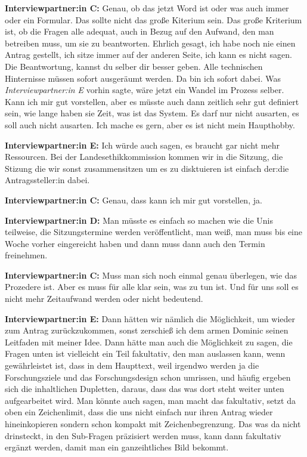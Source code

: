 \documentclass[a4paper,12pt,twoside]{scrreprt}
\begin{document}
\textbf{Interviewpartner:in C:} Genau, ob das jetzt Word ist oder was auch immer oder ein Formular. Das sollte nicht das große Kiterium sein. Das große Kriterium ist, ob die Fragen alle adequat, auch in Bezug auf den Aufwand, den man betreiben muss, um sie zu beantworten. Ehrlich gesagt, ich habe noch nie einen Antrag gestellt, ich sitze immer auf der anderen Seite, ich kann es nicht sagen. Die Beantwortung, kannst du selber dir besser geben. Alle technischen Hinternisse müssen sofort ausgeräumt werden. Da bin ich sofort dabei. Was \textit{Interviewpartner:in E} vorhin sagte, wäre jetzt ein Wandel im Prozess selber. Kann ich mir gut vorstellen, aber es müsste auch dann zeitlich sehr gut definiert sein, wie lange haben sie Zeit, was ist das System. Es darf nur nicht ausarten, es soll auch nicht ausarten. Ich mache es gern, aber es ist nicht mein Haupthobby.

\textbf{Interviewpartner:in E:} Ich würde auch sagen, es braucht gar nicht mehr Ressourcen. Bei der Landesethikkommission kommen wir in die Sitzung, die Stizung die wir sonst zusammensitzen um es zu disktuieren ist einfach der:die Antragssteller:in dabei.

\textbf{Interviewpartner:in C:} Genau, dass kann ich mir gut vorstellen, ja.

\textbf{Interviewpartner:in D:} Man müsste es einfach so machen wie die Unis teilweise, die Sitzungstermine werden veröffentlicht, man weiß, man muss bis eine Woche vorher eingereicht haben und dann muss dann auch den Termin freinehmen.

\textbf{Interviewpartner:in C:} Muss man sich noch einmal genau überlegen, wie das Prozedere ist. Aber es muss für alle klar sein, was zu tun ist. Und für uns soll es nicht mehr Zeitaufwand werden oder nicht bedeutend.

\textbf{Interviewpartner:in E:} Dann hätten wir nämlich die Möglichkeit, um wieder zum Antrag zurückzukommen, sonst zerschieß ich dem armen Dominic seinen Leitfaden mit meiner Idee. Dann hätte man auch die Möglichkeit zu sagen, die Fragen unten ist vielleicht ein Teil fakultativ, den man auslassen kann, wenn gewährleistet ist, dass in dem Haupttext, weil irgendwo werden ja die Forschungsziele und das Forschungsdesign schon umrissen, und häufig ergeben sich die inhaltlichen Dupletten, daraus, dass das was dort steht weiter unten aufgearbeitet wird. Man könnte auch sagen, man macht das fakultativ, setzt da oben ein Zeichenlimit, dass die uns nicht einfach nur ihren Antrag wieder hineinkopieren sondern schon kompakt mit Zeichenbegrenzung. Das was da nicht drinsteckt, in den Sub-Fragen präzisiert werden muss, kann dann fakultativ ergänzt werden, damit man ein ganzeihtliches Bild bekommt.
\end{document}
